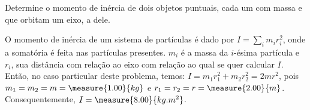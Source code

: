 \begin{question}
    Determine o momento de inércia de dois objetos puntuais, cada um com massa  e que orbitam um eixo, a  dele.

    \begin{answer}
    \end{answer}

    \begin{solution}
      O momento de inércia de um sistema de partículas é dado por $I = \sum_i m_i r_i^2$, onde a somatória é feita nas partículas presentes. $m_i$ é a massa da $i$-ésima partícula e $r_i$, sua distância com relação ao eixo com relação ao qual se quer calcular $I$.
      Então, no caso particular deste problema, temos: $I = m_1 r_1^2 + m_2 r_2^2 = 2 mr^2$, pois $m_1 = m_2 = m = \measure{1.00}{kg}$ e $r_1 = r_2 = r = \measure{2.00}{m}$.
      Consequentemente, $I = \measure{8.00}{kg.m^2}$.
    \end{solution}
\end{question}